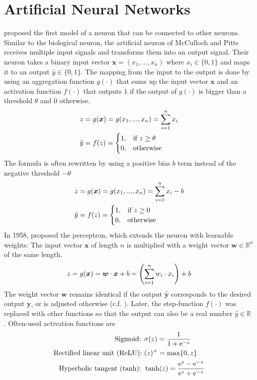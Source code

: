 \section{Artificial Neural Networks}
 proposed the first model of a neuron that can be connected to other neurons.
Similar to the biological neuron, the artificial neuron of McCulloch and Pitts receives multiple input signals and transforms them into an output signal.
Their neuron takes a binary input vector $\boldsymbol{x} = (x_1, ..., x_n)$ where $x_i \in \{0, 1\}$ and maps it to an output $\hat{y} \in \{0, 1\}$.
The mapping from the input to the output is done by using an aggregation function $g(\cdot)$ that sums up the input vector $\boldsymbol{x}$ and an activation function $f(\cdot)$ that outputs $1$ if the output of $g(\cdot)$ is bigger than a threshold $\theta$ and $0$ otherwise.
%
\begin{align}\eqlbl{McCulloch_Pitts_agg}%
	z &= g(\boldsymbol{x}) = g(x_1, ..., x_n) = \sum_{i=1}^{n}x_i\\
		\hat{y} &= f(z) = \begin{cases}
      		1, & \text{if}\ z \geq \theta \\
      		0, & \text{otherwise}
    	\end{cases}
\end{align}
%
The formula is often rewritten by using a positive  bias $b$ term instead of the negative threshold $- \theta$
%
\begin{align}\eqlbl{McCulloch_Pitts_agg}%
	z &= g(\boldsymbol{x}) = g(x_1, ..., x_n) = \sum_{i=1}^{n}x_i-b\\
		\hat{y} &= f(z) = \begin{cases}
      		1, & \text{if}\ z \geq 0 \\
      		0, & \text{otherwise}
    	\end{cases}
\end{align}
%
In 1958,  proposed the perceptron, which extends the neuron with learnable weights: The input vector $\boldsymbol{x}$ of length $n$ is multiplied with a weight vector $\boldsymbol{w} \in \mathbb{R}^n$ of the same length.
%
\begin{align}\eqlbl{nn}%
	z = g(\boldsymbol{x}) = \boldsymbol{w} \cdot \boldsymbol{x} + b = \left( \sum_{i=1}^{n}w_i \cdot x_i \right) + b
\end{align}
%
The weight vector $\boldsymbol{w}$ remains identical if the output $\boldsymbol{\hat{y}}$ corresponds to the desired output $\boldsymbol{y}$, or is adjusted otherwise (c.f. ). Later, the step-function \(f(\cdot)\) was replaced with other functions so that the output can also be a real number \(\hat{y} \in \mathbb{R}\) . Often-used activation functions are
%
\begin{align}\eqlbl{act_functions}%
		\text{Sigmoid: } & \sigma(z) = \frac{1}{1+\mathrm{e}^{-z}}\\
		\text{Rectified linear unit (ReLU): } & (z)^{+} = \max\{0, z\}\\
		\text{Hyperbolic tangent (tanh): }  & \tanh(z) = \frac{\mathrm{e}^{z}-\mathrm{e}^{-z}}{\mathrm{e}^{z}+\mathrm{e}^{-z}}
\end{align}

